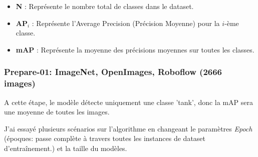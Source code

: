 \begin{itemize}
	\item \textbf{N} : Représente le nombre total de classes dans le dataset.
	\item \textbf{AP$_i$} : Représente l'Average Precision (Précision Moyenne) pour la $i$-ème classe.
	\item \textbf{mAP} : Représente la moyenne des précisions moyennes sur toutes les classes.
\end{itemize}



\subsubsection*{Prepare-01: ImageNet, OpenImages, Roboflow (2666 images)}

A cette étape, le modèle détecte uniquement une classe 'tank', donc la mAP sera une moyenne de toutes les images.

J’ai essayé plusieurs scénarios sur l’algorithme en changeant le paramètres \textit{Epoch} (époques: passe complète à travers toutes les instances de dataset d'entraînement.) et la taille du modèles.

